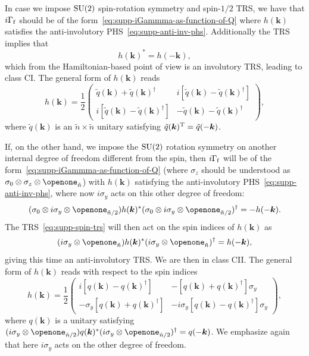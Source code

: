 \documentclass[prl,twocolumn,preprintnumbers,superscriptaddress,amsmath,amssymb]{revtex4-1}
\begin{document}
In case we impose ${\rm SU}(2)$ spin-rotation symmetry and spin-$1/2$ TRS, we have that $i\Gamma_{\rm f}$ should be of the form~\eqref{eq:supp-iGammma-as-function-of-Q} where $h(\boldsymbol{k})$ satisfies the anti-involutory PHS~\eqref{eq:supp-anti-inv-phs}. Additionally the TRS implies that
\begin{equation}
    h(\boldsymbol{k})^*=h(-\boldsymbol{k}),
\end{equation}
which from the Hamiltonian-based point of view is an involutory TRS, leading to class CI. The general form of $h(\boldsymbol{k})$ reads 
\begin{equation}
h(\boldsymbol{k})=\frac{1}{2}\begin{pmatrix} \tilde q(\boldsymbol{k})+\tilde q(\boldsymbol{k})^\dag & i[\tilde q(\boldsymbol{k})-\tilde q(\boldsymbol{k})^\dag] \\ i[\tilde q(\boldsymbol{k})-\tilde q(\boldsymbol{k})^\dag] & -\tilde q(\boldsymbol{k})-\tilde q(\boldsymbol{k})^\dag \end{pmatrix},
\label{CIH}
\end{equation}
where $\tilde q(\boldsymbol{k})$ is an $\tilde n\times \tilde n$ unitary satisfying $\tilde q(\boldsymbol{k})^{\rm T}=\tilde q(-\boldsymbol{k})$.


If, on the other hand, we impose the ${\rm SU}(2)$ rotation symmetry on another internal degree of freedom different from the spin, then $i\Gamma_{\rm f}$ will be of the form~\eqref{eq:supp-iGammma-as-function-of-Q} (where $\sigma_z$ should be understood as $\sigma_0\otimes\sigma_z\otimes\openone_{\tilde n}$) with $h(\boldsymbol{k})$ satisfying the anti-involutory PHS~\eqref{eq:supp-anti-inv-phs}, where now $i\sigma_y$ acts on this other degree of freedom: 
\begin{equation}
    (\sigma_0\otimes i\sigma_y\otimes\openone_{\tilde n/2})h(\boldsymbol{k})^*(\sigma_0\otimes i\sigma_y\otimes\openone_{\tilde n/2})^\dag=-h(-\boldsymbol{k}).
\end{equation}
The TRS~\eqref{eq:supp-spin-trs} will then act on the spin indices of $h(\boldsymbol{k})$ as 
\begin{equation}
    (i\sigma_y\otimes\openone_{\tilde n})h(\boldsymbol{k})^*(i\sigma_y\otimes\openone_{\tilde n})^\dag=h(-\boldsymbol{k}),
\end{equation}
giving this time an anti-involutory TRS. We are then in class CII. The general form of $h(\boldsymbol{k})$ reads with respect to the spin indices
\begin{equation}
h(\boldsymbol{k})=\frac{1}{2}\begin{pmatrix}i[q(\boldsymbol{k})-q(\boldsymbol{k})^\dag] & -[q(\boldsymbol{k})+q(\boldsymbol{k})^\dag]\sigma_y \\
-\sigma_y[q(\boldsymbol{k})+q(\boldsymbol{k})^\dag] & -i\sigma_y [q(\boldsymbol{k})-q(\boldsymbol{k})^\dag]\sigma_y \end{pmatrix},
\label{CIIH}
\end{equation}
where $q(\boldsymbol{k})$ is a unitary satisfying $(i\sigma_y\otimes\openone_{\tilde n/2})q(\boldsymbol{k})^*(i\sigma_y\otimes\openone_{\tilde n/2})^\dag=q(-\boldsymbol{k})$. We emphasize again that here $i\sigma_y$ acts on the other degree of freedom.
\end{document}

